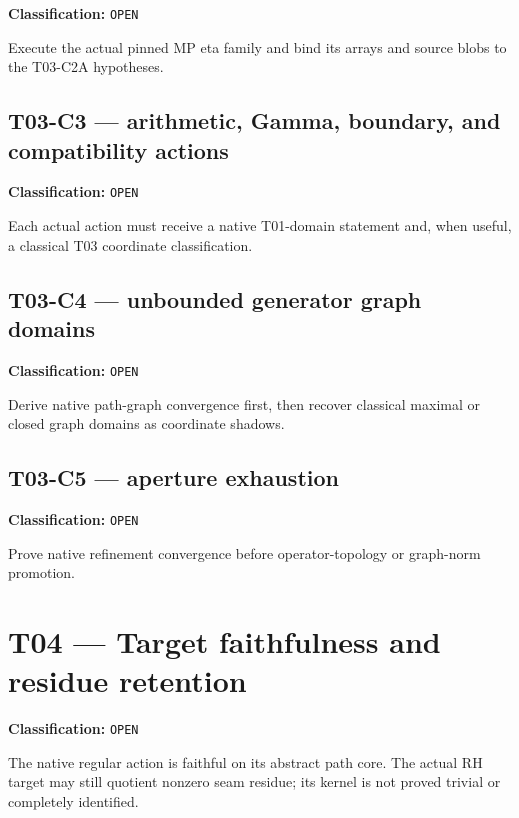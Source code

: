 \textbf{Classification:} \texttt{OPEN}

Execute the actual pinned MP eta family and bind its arrays and source blobs to
the T03-C2A hypotheses.

\hypertarget{t03-c3-arithmetic-gamma-boundary-and-compatibility-actions}{%
\subsection{T03-C3 --- arithmetic, Gamma, boundary, and compatibility actions}\label{t03-c3-arithmetic-gamma-boundary-and-compatibility-actions}}

\textbf{Classification:} \texttt{OPEN}

Each actual action must receive a native T01-domain statement and, when useful,
a classical T03 coordinate classification.

\hypertarget{t03-c4-unbounded-generator-graph-domains}{%
\subsection{T03-C4 --- unbounded generator graph domains}\label{t03-c4-unbounded-generator-graph-domains}}

\textbf{Classification:} \texttt{OPEN}

Derive native path-graph convergence first, then recover classical maximal or
closed graph domains as coordinate shadows.

\hypertarget{t03-c5-aperture-exhaustion}{%
\subsection{T03-C5 --- aperture exhaustion}\label{t03-c5-aperture-exhaustion}}

\textbf{Classification:} \texttt{OPEN}

Prove native refinement convergence before operator-topology or graph-norm
promotion.

\hypertarget{t04-target-faithfulness-and-residue-retention}{%
\section{T04 --- Target faithfulness and residue retention}\label{t04-target-faithfulness-and-residue-retention}}

\textbf{Classification:} \texttt{OPEN}

The native regular action is faithful on its abstract path core. The actual RH
target may still quotient nonzero seam residue; its kernel is not proved trivial
or completely identified.

